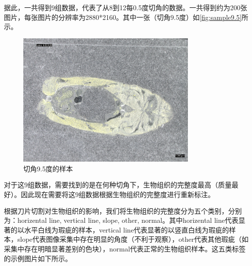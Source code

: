 
据此，一共得到9组数据，代表了从8到12每0.5度切角的数据。一共得到约为200张图片，每张图片的分辨率为2880*2160。其中一张（切角9.5度）如\autoref{fig:sample9.5}所示。

\begin{figure}
    \centering
    \includegraphics[width=0.8\textwidth]{./fig/sample9.5.jpg}
    \caption{切角9.5度的样本}
    \label{fig:sample9.5}
\end{figure}

对于这9组数据，需要找到的是在何种切角下，生物组织的完整度最高（质量最好）。因此现在需要将这9组数据根据生物组织的完整度进行重新标注。

根据刀片切割对生物组织的影响，我们将生物组织的完整度分为五个类别，分别为：horizental line, vertical line, slope, other, normal。其中horizental line代表显著的以水平白线为瑕疵的样本，vertical line代表显著的以竖直白线为瑕疵的样本，slope代表图像采集中存在明显的角度（不利于观察），other代表其他瑕疵（如采集中存在明暗显著差别的色块），normal代表正常的生物组织样本。这五类标签的示例图片如下所示。

